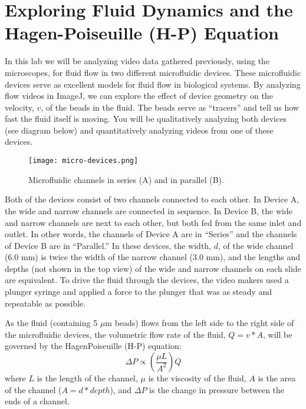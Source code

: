 \chapter{Exploring Fluid Dynamics and the Hagen-Poiseuille (H-P) Equation}
\thispagestyle{fancy}
%
In this lab we will be analyzing video data gathered previously, using the microscopes, for
fluid flow in two different microfluidic devices.
These microfluidic devices serve as excellent models for fluid flow in biological systems.
By analyzing flow videos in ImageJ, we can explore the effect of device geometry on the velocity, $v$, of the beads in the fluid.
The beads serve as ``tracers'' and tell us how fast the fluid itself is moving.
You will be qualitatively analyzing both devices (see diagram below) and quantitatively analyzing videos from one of these devices.

\begin{figure}[hbtp]
	\centering
	\texttt{[image: micro-devices.png]}
	\caption{Microfluidic channels in series (A) and in parallel (B).}
	\label{fig:series-parallel}
\end{figure}

Both of the devices consist of two channels connected to each other.
In Device A, the wide and narrow channels are connected in sequence.
In Device B, the wide and narrow channels are next to each other, but both fed from the same inlet and outlet.
In other words, the channels of Device A are in ``Series'' and the channels of Device B are in ``Parallel.''
In these devices, the width, $d$, of the wide channel (6.0 mm) is twice the width of the narrow channel (3.0 mm), and the lengths and depths (not shown in the top view) of the wide and narrow channels on each slide are equivalent.
To drive the fluid through the devices, the video makers used a plunger syringe and applied a force to the plunger that was as steady and repeatable as possible.
\par
As the fluid (containing 5 $\mu$m beads) flows from the left side to the right side of the
microfluidic devices, the volumetric flow rate of the fluid, $Q = v*A$, will be governed by the HagenPoiseuille (H-P) equation:
\[ \Delta P \propto \left( \frac{\mu L}{A^{2}} \right) Q \]
where $L$ is the length of the channel, $\mu$ is the viscosity of the fluid, $A$ is the area of the channel ($A = d*depth$), and $\Delta P$ is the change in pressure between the ends of a channel.

